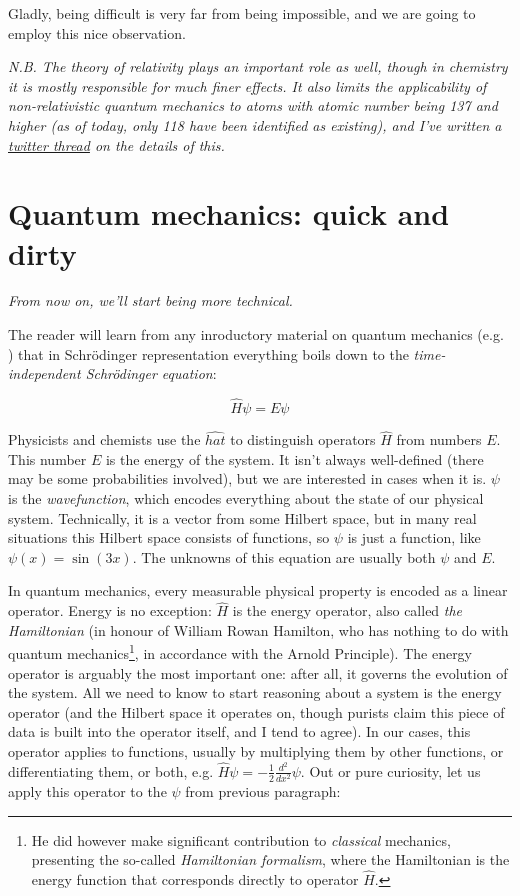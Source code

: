 \documentclass{article}
\begin{document}
Gladly, being difficult is very far from being impossible, and we are going to employ this nice observation.

\textit{N.B. The theory of relativity plays an important role as well, though in chemistry it is mostly responsible for much finer effects. It also limits the applicability of non-relativistic quantum mechanics to atoms with atomic number being 137 and higher (as of today, only 118 have been identified as existing), and I've written a \href{https://twitter.com/lisyarus/status/1189227697605660673?s=20}{twitter thread} on the details of this.}

\section{Quantum mechanics: quick and dirty} \label{sec:qm}

\textit{From now on, we'll start being more technical.}

The reader will learn from any inroductory material on quantum mechanics (e.g. \cite{ref:atkins}) that in Schrödinger representation everything boils down to the \textit{time-independent Schrödinger equation}:

\begin{equation} \label{eq:shrod} \hat H \psi = E \psi \end{equation}

Physicists and chemists use the \(\widehat{hat}\) to distinguish operators \(\hat H\) from numbers \(E\). This number \(E\) is the energy of the system. It isn't always well-defined (there may be some probabilities involved), but we are interested in cases when it is. \(\psi\) is the \textit{wavefunction}, which encodes everything about the state of our physical system. Technically, it is a vector from some Hilbert space, but in many real situations this Hilbert space consists of functions, so \(\psi\) is just a function, like \(\psi(x) = \sin(3x)\). The unknowns of this equation are usually both \(\psi\) and \(E\).

In quantum mechanics, every measurable physical property is encoded as a linear operator. Energy is no exception: \(\hat H\) is the energy operator, also called \textit{the Hamiltonian} (in honour of William Rowan Hamilton, who has nothing to do with quantum mechanics\footnote{He did however make significant contribution to \textit{classical} mechanics, presenting the so-called \textit{Hamiltonian formalism}, where the Hamiltonian is the energy function that corresponds directly to operator \(\hat H\).}, in accordance with the Arnold Principle). The energy operator is arguably the most important one: after all, it governs the evolution of the system. All we need to know to start reasoning about a system is the energy operator (and the Hilbert space it operates on, though purists claim this piece of data is built into the operator itself, and I tend to agree). In our cases, this operator applies to functions, usually by multiplying them by other functions, or differentiating them, or both, e.g. \(\hat H \psi = -\frac{1}{2} \frac{d^2}{dx^2}\psi\). Out or pure curiosity, let us apply this operator to the \(\psi\) from previous paragraph:
\end{document}
